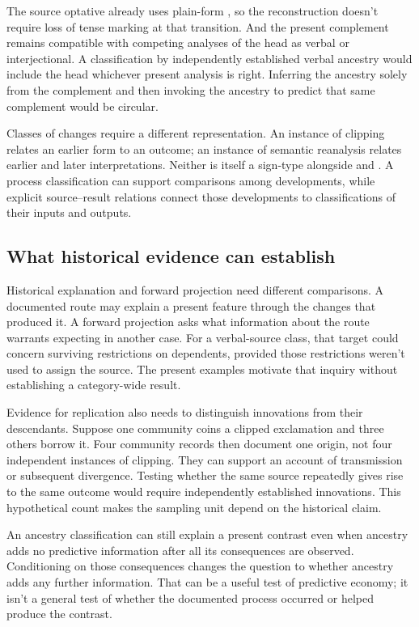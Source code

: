 \documentclass[12pt]{article}
\begin{document}
The source optative already uses plain-form , so the
reconstruction doesn't require loss of tense marking at that transition.
And the present complement remains compatible with competing analyses
of the head as verbal or interjectional. A classification by independently
established verbal ancestry would include the head whichever present
analysis is right.
Inferring the ancestry solely from the complement and then invoking
the ancestry to predict that same complement would be circular.

Classes of changes require a different representation. An instance of
clipping relates an earlier form to an outcome; an instance of semantic
reanalysis relates earlier and later interpretations. Neither is itself
a sign-type alongside  and . A process
classification can support comparisons among developments, while explicit
source--result relations connect those developments to classifications
of their inputs and outputs.

\subsection{What historical evidence can establish}

Historical explanation and forward projection need different comparisons.
A documented route may explain a present feature through the changes
that produced it. A forward projection asks what information about the
route warrants expecting in another case. For a verbal-source class,
that target could concern surviving restrictions on dependents, provided
those restrictions weren't used to assign the source. The present
examples motivate that inquiry without establishing a category-wide result.

Evidence for replication also needs to distinguish innovations from their
descendants. Suppose one community coins a clipped exclamation and
three others borrow it. Four community records then document one
origin, not four independent instances of clipping. They can support
an account of transmission or subsequent divergence. Testing whether
the same source repeatedly gives rise to the same outcome would
require independently established innovations. This hypothetical count
makes the sampling unit depend on the historical claim.

An ancestry classification can still explain a present contrast even
when ancestry adds no predictive information after all its consequences
are observed. Conditioning on those consequences changes the question
to whether ancestry adds any further information. That can be a useful
test of predictive economy; it isn't a general test of whether the
documented process occurred or helped produce the contrast.
\end{document}
